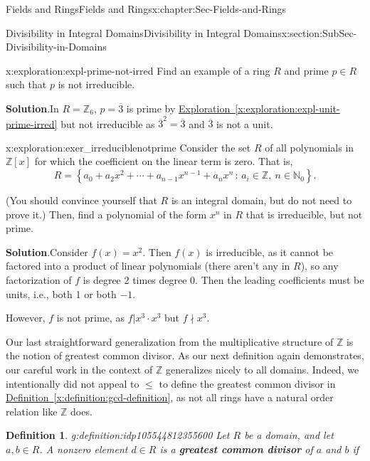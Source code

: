 \documentclass[oneside,10pt,]{book}
\newcommand{\blocktitlefont}{\relax}
\newcommand{\xreffont}{\relax}
\newcommand{\terminology}[1]{\textbf{#1}}
\numberwithin{equation}{section}
\renewcommand{\le}{\leqslant}
\newcommand{\setof}[2]{{\left\{#1\,\colon\,#2\right\}}}
\def\Z{{\mathbb Z}}
\def\N{{\mathbb N}}
\newtheorem{definition}[theorem]{Definition}
\begin{document}
\begin{chapterptx}{Fields and Rings}{}{Fields and Rings}{}{}{x:chapter:Sec-Fields-and-Rings}
\begin{sectionptx}{Divisibility in Integral Domains}{}{Divisibility in Integral Domains}{}{}{x:section:SubSec-Divisibility-in-Domains}
\begin{exploration}{}{x:exploration:expl-prime-not-irred}
Find an example of a ring \(R\) and prime \(p\in R\) such that \(p\) is not irreducible.%
\par\smallskip%
\noindent\textbf{\blocktitlefont Solution}.\hypertarget{g:solution:idp105544812802320}{}\quad{}In \(R = \Z_6\), \(p = \overline{3}\) is prime by \hyperref[x:exploration:expl-unit-prime-irred]{Exploration~{\xreffont\ref{x:exploration:expl-unit-prime-irred}}} but not irreducible as \(\overline{3}^2 = \overline{3}\) and \(\overline{3}\) is not a unit.%
\end{exploration}%
\begin{exploration}{}{x:exploration:exer_irreduciblenotprime}%
Consider the set \(R\) of all polynomials in \(\Z[x]\) for which the coefficient on the linear term is zero. That is,%
\begin{equation*}
R = \setof{a_0 + a_2 x^2 + \cdots + a_{n-1} x^{n-1} + a_n x^n}{a_i\in \Z,\ n\in\N_0}\text{.}
\end{equation*}
%
\par
(You should convince yourself that \(R\) is an integral domain, but do not need to prove it.) Then, find a polynomial of the form \(x^n\) in \(R\) that is irreducible, but not prime.%
\par\smallskip%
\noindent\textbf{\blocktitlefont Solution}.\hypertarget{g:solution:idp105544812808080}{}\quad{}Consider \(f(x) = x^2\). Then \(f(x)\) is irreducible, as it cannot be factored into a product of linear polynomials (there aren't any in \(R\)), so any factorization of \(f\) is degree 2 times degree 0. Then the leading coefficients must be units, i.e., both 1 or both \(-1\).%
\par
However, \(f\) is not prime, as \(f| x^3 \cdot x^3\) but \(f\nmid x^3\).%
\end{exploration}%
Our last straightforward generalization from the multiplicative structure of \(\Z\) is the notion of greatest common divisor. As our next definition again demonstrates, our careful work in the context of \(\Z\) generalizes nicely to all domains. Indeed, we intentionally did not appeal to \(\le\) to define the greatest common divisor in \hyperref[x:definition:gcd-definition]{Definition~{\xreffont\ref{x:definition:gcd-definition}}}, as not all rings have a natural order relation like \(\Z\) does.%
\begin{definition}{}{g:definition:idp105544812355600}%
%
Let \(R\) be a domain, and let \(a,b\in R\). A nonzero element \(d\in R\) is a \terminology{greatest common divisor} of \(a\) and \(b\) if%

\end{definition}
\end{sectionptx}
\end{chapterptx}
\end{document}

